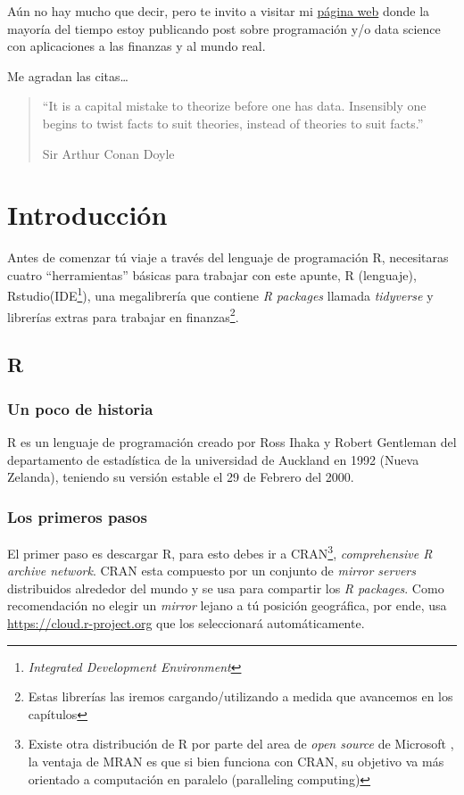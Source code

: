 \documentclass[12pt,]{book}
\begin{document}
Aún no hay mucho que decir, pero te invito a visitar mi \href{}{página
web} donde la mayoría del tiempo estoy publicando post sobre
programación y/o data science con aplicaciones a las finanzas y al mundo
real.

Me agradan las citas\ldots{}

\begin{quote}
``It is a capital mistake to theorize before one has data. Insensibly
one begins to twist facts to suit theories, instead of theories to suit
facts.''

Sir Arthur Conan Doyle
\end{quote}

\chapter{Introducción}\label{intro}

Antes de comenzar tú viaje a través del lenguaje de programación R,
necesitaras cuatro ``herramientas'' básicas para trabajar con este
apunte, R (lenguaje), Rstudio(IDE\footnote{\emph{Integrated Development
  Environment}}), una megalibrería que contiene \emph{R packages}
llamada \emph{tidyverse} y librerías extras para trabajar en
finanzas\footnote{Estas librerías las iremos cargando/utilizando a
  medida que avancemos en los capítulos}.

\section{R}\label{r}

\subsection{Un poco de historia}\label{un-poco-de-historia}

R es un lenguaje de programación creado por Ross Ihaka y Robert
Gentleman del departamento de estadística de la universidad de Auckland
en 1992 (Nueva Zelanda), teniendo su versión estable el 29 de Febrero
del 2000.

\subsection{Los primeros pasos}\label{los-primeros-pasos}

El primer paso es descargar R, para esto debes ir a CRAN\footnote{Existe
  otra distribución de R por parte del area de \emph{open source} de
  Microsoft , la ventaja de MRAN es que si bien funciona con CRAN, su
  objetivo va más orientado a computación en paralelo (paralleling
  computing)}, \emph{comprehensive R archive network}. CRAN esta
compuesto por un conjunto de \emph{mirror servers} distribuidos
alrededor del mundo y se usa para compartir los \emph{R packages}. Como
recomendación no elegir un \emph{mirror} lejano a tú posición
geográfica, por ende, usa \url{https://cloud.r-project.org} que los
seleccionará automáticamente.
\end{document}
